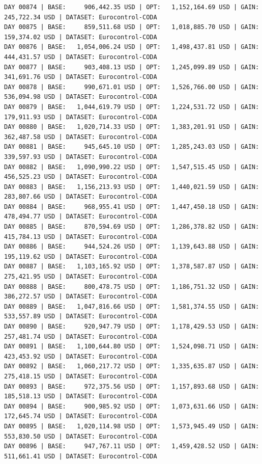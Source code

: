 \documentclass[11pt,a4paper]{article}
\begin{document}
\begin{verbatim}
DAY 00874 | BASE:     906,442.35 USD | OPT:   1,152,164.69 USD | GAIN: 245,722.34 USD | DATASET: Eurocontrol-CODA
DAY 00875 | BASE:     859,511.68 USD | OPT:   1,018,885.70 USD | GAIN: 159,374.02 USD | DATASET: Eurocontrol-CODA
DAY 00876 | BASE:   1,054,006.24 USD | OPT:   1,498,437.81 USD | GAIN: 444,431.57 USD | DATASET: Eurocontrol-CODA
DAY 00877 | BASE:     903,408.13 USD | OPT:   1,245,099.89 USD | GAIN: 341,691.76 USD | DATASET: Eurocontrol-CODA
DAY 00878 | BASE:     990,671.01 USD | OPT:   1,526,766.00 USD | GAIN: 536,094.98 USD | DATASET: Eurocontrol-CODA
DAY 00879 | BASE:   1,044,619.79 USD | OPT:   1,224,531.72 USD | GAIN: 179,911.93 USD | DATASET: Eurocontrol-CODA
DAY 00880 | BASE:   1,020,714.33 USD | OPT:   1,383,201.91 USD | GAIN: 362,487.58 USD | DATASET: Eurocontrol-CODA
DAY 00881 | BASE:     945,645.10 USD | OPT:   1,285,243.03 USD | GAIN: 339,597.93 USD | DATASET: Eurocontrol-CODA
DAY 00882 | BASE:   1,090,990.22 USD | OPT:   1,547,515.45 USD | GAIN: 456,525.23 USD | DATASET: Eurocontrol-CODA
DAY 00883 | BASE:   1,156,213.93 USD | OPT:   1,440,021.59 USD | GAIN: 283,807.66 USD | DATASET: Eurocontrol-CODA
DAY 00884 | BASE:     968,955.41 USD | OPT:   1,447,450.18 USD | GAIN: 478,494.77 USD | DATASET: Eurocontrol-CODA
DAY 00885 | BASE:     870,594.69 USD | OPT:   1,286,378.82 USD | GAIN: 415,784.13 USD | DATASET: Eurocontrol-CODA
DAY 00886 | BASE:     944,524.26 USD | OPT:   1,139,643.88 USD | GAIN: 195,119.62 USD | DATASET: Eurocontrol-CODA
DAY 00887 | BASE:   1,103,165.92 USD | OPT:   1,378,587.87 USD | GAIN: 275,421.95 USD | DATASET: Eurocontrol-CODA
DAY 00888 | BASE:     800,478.75 USD | OPT:   1,186,751.32 USD | GAIN: 386,272.57 USD | DATASET: Eurocontrol-CODA
DAY 00889 | BASE:   1,047,816.66 USD | OPT:   1,581,374.55 USD | GAIN: 533,557.89 USD | DATASET: Eurocontrol-CODA
DAY 00890 | BASE:     920,947.79 USD | OPT:   1,178,429.53 USD | GAIN: 257,481.74 USD | DATASET: Eurocontrol-CODA
DAY 00891 | BASE:   1,100,644.80 USD | OPT:   1,524,098.71 USD | GAIN: 423,453.92 USD | DATASET: Eurocontrol-CODA
DAY 00892 | BASE:   1,060,217.72 USD | OPT:   1,335,635.87 USD | GAIN: 275,418.15 USD | DATASET: Eurocontrol-CODA
DAY 00893 | BASE:     972,375.56 USD | OPT:   1,157,893.68 USD | GAIN: 185,518.13 USD | DATASET: Eurocontrol-CODA
DAY 00894 | BASE:     900,985.92 USD | OPT:   1,073,631.66 USD | GAIN: 172,645.74 USD | DATASET: Eurocontrol-CODA
DAY 00895 | BASE:   1,020,114.98 USD | OPT:   1,573,945.49 USD | GAIN: 553,830.50 USD | DATASET: Eurocontrol-CODA
DAY 00896 | BASE:     947,767.11 USD | OPT:   1,459,428.52 USD | GAIN: 511,661.41 USD | DATASET: Eurocontrol-CODA

\end{verbatim}
\end{document}
